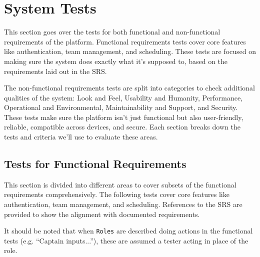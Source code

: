 \documentclass[12pt, titlepage]{article}
\begin{document}




\section{System Tests}

This section goes over the tests for both functional and non-functional requirements of the platform. Functional requirements tests cover core features like authentication, team management, and scheduling. These tests are focused on making sure the system does exactly what it’s supposed to, based on the requirements laid out in the SRS.

The non-functional requirements tests are split into categories to check additional qualities of the system: Look and Feel, Usability and Humanity, Performance, Operational and Environmental, Maintainability and Support, and Security. These tests make sure the platform isn’t just functional but also user-friendly, reliable, compatible across devices, and secure. Each section breaks down the tests and criteria we’ll use to evaluate these areas.

\subsection{Tests for Functional Requirements}

This section is divided into different areas to cover subsets of the functional requirements comprehensively. The following tests cover core features like authentication, team management, and scheduling. References to the SRS are provided to show the alignment with documented requirements.

It should be noted that when \texttt{Roles} are described doing actions in the functional tests (e.g. ``Captain inputs...''), these are assumed a tester acting in place of the role.
\end{document}
